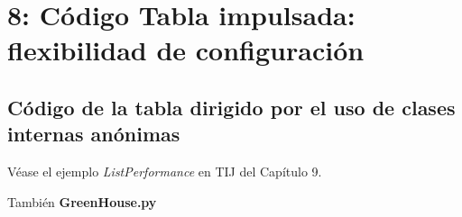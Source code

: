 \section*{\texorpdfstring{8: Código Tabla impulsada: \newline flexibilidad de configuración}{8: Código Tabla impulsada: flexibilidad de configuración}}
\label{sec:ctifdc}



\subsection*{Código de la tabla dirigido por el uso de clases internas anónimas}
\label{subsec:cdltdpeudcia}

Véase  el ejemplo \textit{ListPerformance} en TIJ del Capítulo 9.   \newline

También \textbf{GreenHouse.py}

\newpage
